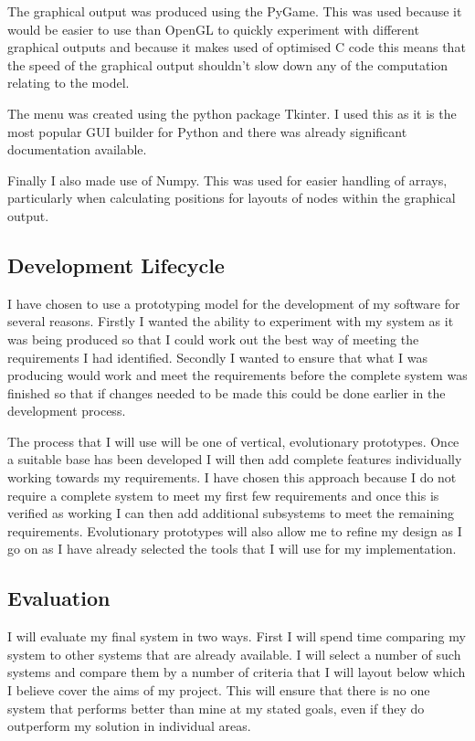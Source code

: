 \documentclass[12pt,a4paper]{article}
\begin{document}
The graphical output was produced using the PyGame. This was used because it would be easier to use than OpenGL to quickly experiment with different graphical outputs and because it makes used of optimised C code this means that the speed of the graphical output shouldn't slow down any of the computation relating to the model.

The menu was created using the python package Tkinter. I used this as it is the most popular GUI builder for Python and there was already significant documentation available.

Finally I also made use of Numpy. This was used for easier handling of arrays, particularly when calculating positions for layouts of nodes within the graphical output.

\subsection{Development Lifecycle}
I have chosen to use a prototyping model for the development of my software for several reasons. Firstly I wanted the ability to experiment with my system as it was being produced so that I could work out the best way of meeting the requirements I had identified. Secondly I wanted to ensure that what I was producing would work and meet the requirements before the complete system was finished so that if changes needed to be made this could be done earlier in the development process.

The process that I will use will be one of vertical, evolutionary prototypes. Once a suitable base has been developed I will then add complete features individually working towards my requirements. I have chosen this approach because I do not require a complete system to meet my first few requirements and once this is verified as working I can then add additional subsystems to meet the remaining requirements. Evolutionary prototypes will also allow me to refine my design as I go on as I have already selected the tools that I will use for my implementation.

\subsection{Evaluation}
I will evaluate my final system in two ways. First I will spend time comparing my system to other systems that are already available. I will select a number of such systems and compare them by a number of criteria that I will layout below which I believe cover the aims of my project. This will ensure that there is no one system that performs better than mine at my stated goals, even if they do outperform my solution in individual areas.
\end{document}
